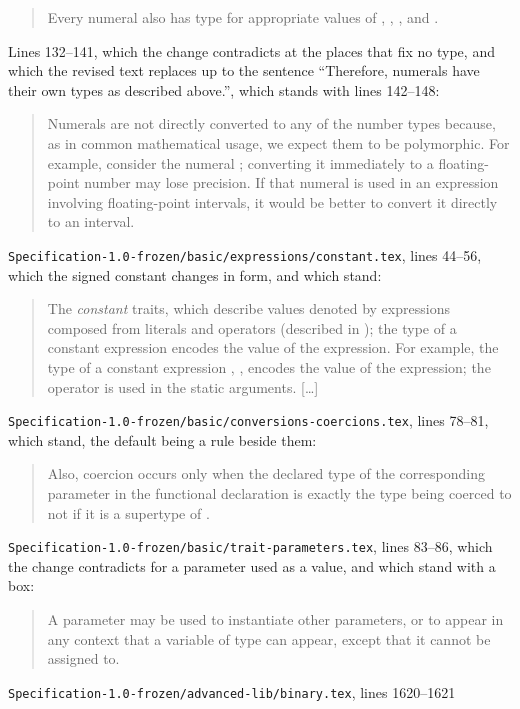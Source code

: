 \begin{description}
\begin{quote}
Every numeral also has type
for appropriate values of , , , and .
\end{quote}
Lines 132--141, which the change contradicts at the places that fix no type, and
which the revised text replaces up to the sentence ``Therefore, numerals have
their own types as described above.'', which stands with lines 142--148:
\begin{quote}
Numerals are not directly converted to any of the number types
because, as in common mathematical usage,
we expect them to be polymorphic.
For example, consider the numeral ;
converting it immediately to a floating-point number
may lose precision.
If that numeral is used in an expression
involving floating-point intervals,
it would be better to convert it directly to an interval.
\end{quote}
\nolinkurl{Specification-1.0-frozen/basic/expressions/constant.tex}, lines
44--56, which the signed constant changes in form, and which stand:
\begin{quote}
The \emph{constant} traits, which describe values denoted by
expressions composed from literals and operators (described in
);
the type of a constant expression encodes the value of the expression.
For example, the type of a constant expression ,
,
encodes the value of the expression; the operator \EXP{+} is
used in the static arguments.
[\ldots]
\end{quote}
\nolinkurl{Specification-1.0-frozen/basic/conversions-coercions.tex}, lines
78--81, which stand, the default being a rule beside them:
\begin{quote}
Also, coercion occurs
only when the declared type of the corresponding parameter in the
functional declaration is exactly the type  being coerced to
not if it is a supertype of .
\end{quote}
\nolinkurl{Specification-1.0-frozen/basic/trait-parameters.tex}, lines 83--86,
which the change contradicts for a  parameter used as a value, and
which stand with a box:
\begin{quote}
A  parameter may be used to instantiate other
 parameters, or to appear in any context that a
variable of type  can appear,
except that it cannot be assigned to.
\end{quote}
\nolinkurl{Specification-1.0-frozen/advanced-lib/binary.tex}, lines 1620--1621

\end{description}
